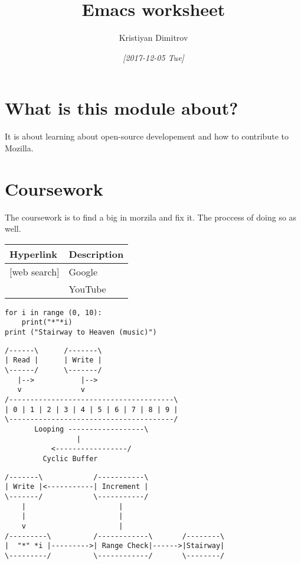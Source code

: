 \documentclass[11pt]{article}
\author{Kristiyan Dimitrov}
\date{\textit{[2017-12-05 Tue]}}
\title{Emacs worksheet}
\begin{document}
\maketitle
\tableofcontents

\section{What is this module about?}
\label{sec-1}
It is about learning about open-source developement and how to contribute to Mozilla.

\section{Coursework}
\label{sec-2}
The coursework is to find a big in morzila and fix it. The proccess of doing so as well.

\begin{center}
\begin{tabular}{ll}
Hyperlink & Description\\
\hline
[www.google.com][web search] & Google\\
[www.youtube.com][videos] & YouTube\\
\end{tabular}
\end{center}



\begin{verbatim}
for i in range (0, 10):
    print("*"*i)
print ("Stairway to Heaven (music)")
\end{verbatim}

\begin{verbatim}
/------\      /-------\
| Read |      | Write |
\------/      \-------/
   |-->           |-->
   v              v
/---------------------------------------\
| 0 | 1 | 2 | 3 | 4 | 5 | 6 | 7 | 8 | 9 |
\---------------------------------------/
       Looping ------------------\
				 |
	       <-----------------/
	     Cyclic Buffer
\end{verbatim}
\begin{verbatim}
/-------\            /-----------\
| Write |<-----------| Increment |
\-------/            \-----------/
    |                      |
    |                      |
    v                      |
/---------\          /------------\       /--------\
|  "*" *i |--------->| Range Check|------>|Stairway|
\---------/          \------------/       \--------/
\end{verbatim}
\end{document}
